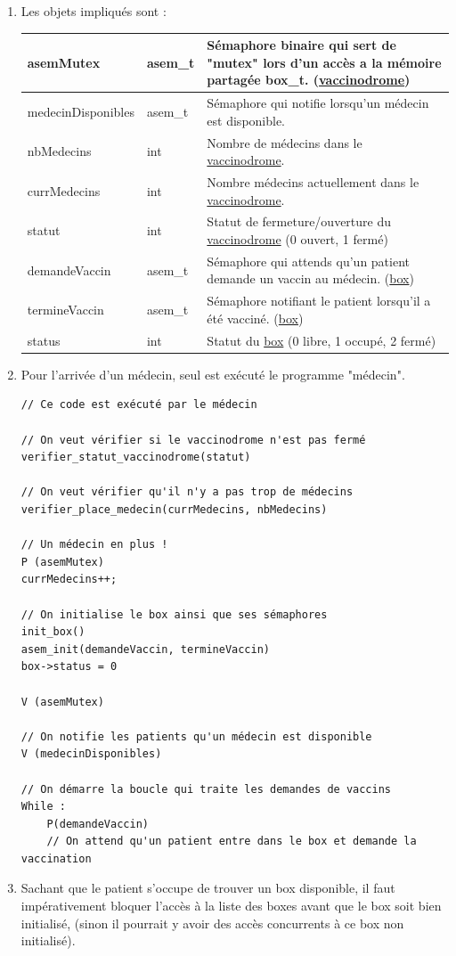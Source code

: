 \documentclass[a4paper]{article}
\begin{document}
  \begin{enumerate}
    \item Les objets impliqués sont :

    \begin{tabularx}{\linewidth}{|l|l|>{\strut}X|}
      \hline%
    asemMutex & asem\_t & Sémaphore binaire qui sert de "mutex" lors d'un accès a la mémoire partagée box\_t. (\underline{vaccinodrome}) \\ \hline%
    medecinDisponibles & asem\_t & Sémaphore qui notifie lorsqu'un médecin est disponible. \\ \hline%

    nbMedecins & int & Nombre de médecins dans le \underline{vaccinodrome}. \\ \hline%
    currMedecins & int & Nombre médecins actuellement dans le \underline{vaccinodrome}. \\ \hline%
    statut & int & Statut de fermeture/ouverture du \underline{vaccinodrome} (0 ouvert, 1 fermé) \\ \hline%

  demandeVaccin & asem\_t & Sémaphore qui attends qu'un patient demande un vaccin au médecin. (\underline{box}) \\ \hline%
termineVaccin & asem\_t & Sémaphore notifiant le patient lorsqu'il a été vacciné. (\underline{box}) \\ \hline%
status & int & Statut du \underline{box} (0 libre, 1 occupé, 2 fermé) \\ \hline%
    \end{tabularx}

  \item Pour l'arrivée d'un médecin, seul est exécuté le programme "médecin".

\begin{verbatim}
// Ce code est exécuté par le médecin

// On veut vérifier si le vaccinodrome n'est pas fermé
verifier_statut_vaccinodrome(statut)

// On veut vérifier qu'il n'y a pas trop de médecins
verifier_place_medecin(currMedecins, nbMedecins)

// Un médecin en plus !
P (asemMutex)
currMedecins++;

// On initialise le box ainsi que ses sémaphores
init_box()
asem_init(demandeVaccin, termineVaccin)
box->status = 0

V (asemMutex)

// On notifie les patients qu'un médecin est disponible
V (medecinDisponibles)

// On démarre la boucle qui traite les demandes de vaccins
While :
    P(demandeVaccin)
    // On attend qu'un patient entre dans le box et demande la vaccination

\end{verbatim}

  \item Sachant que le patient s'occupe de trouver un box disponible, il faut impérativement bloquer l'accès à la liste des boxes avant que le box soit bien initialisé, (sinon il pourrait y avoir des accès concurrents à ce box non initialisé).
  \end{enumerate}
\newpage
\end{document}

